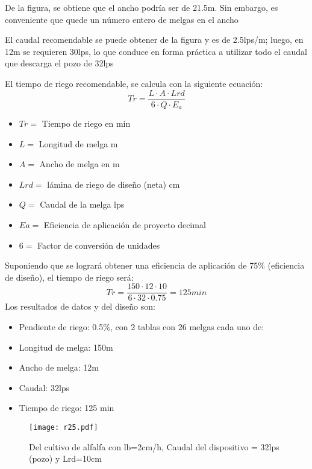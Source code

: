 De la figura, se obtiene que el ancho podría ser de 21.5m. Sin embargo, es conveniente que quede un número entero de melgas en el ancho

El caudal recomendable se puede obtener de la figura y es de 2.5lps/m; luego, en 12m se requieren 30lps, lo que conduce en forma práctica a utilizar
todo el caudal que descarga el pozo de 32lps

El tiempo de riego recomendable, se calcula con la siguiente ecuación:
\begin{equation}
    Tr=\frac{L\cdot A\cdot Lrd}{6\cdot Q\cdot E_a}
    \label{eqr1}
\end{equation}
\begin{notation}
    \begin{itemize}
        \item $Tr=$ Tiempo de riego en min
        \item $L=$ Longitud de melga m
        \item $A=$ Ancho de melga en m
        \item $Lrd=$ lámina de riego de diseño (neta) cm
        \item $Q=$ Caudal de la melga lps
        \item $Ea=$ Eficiencia de aplicación de proyecto decimal
        \item $6=$ Factor de conversión de unidades
    \end{itemize}
\end{notation}
Suponiendo que se logrará obtener una eficiencia de aplicación de 75\% (eficiencia de diseño), el tiempo de riego será:
    \begin{equation*}
        Tr= \frac{150\cdot 12\cdot 10}{6\cdot 32\cdot 0.75} = 125 min
    \end{equation*}
Los resultados de datos y del diseño son:
\begin{itemize}
    \item Pendiente de riego: 0.5\%, con 2 tablas con 26 melgas cada uno de:
    \item Longitud de melga: 150m
    \item Ancho de melga: 12m
    \item Caudal: 32lps
    \item Tiempo de riego: 125 min
\end{itemize}
\begin{figure}
    \centering
    \texttt{[image: r25.pdf]}
    \caption{Del cultivo de alfalfa con lb=2cm/h, Caudal del dispositivo = 32lps (pozo) y Lrd=10cm}
    \label{r25}
\end{figure}

